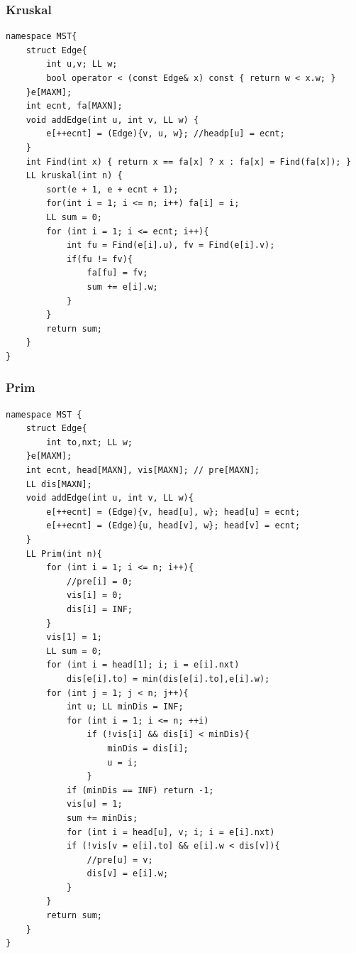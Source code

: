 \documentclass[10pt]{ctexart}
\begin{document}
{\subsubsection{Kruskal}
\begin{lstlisting}
namespace MST{
    struct Edge{
        int u,v; LL w;
        bool operator < (const Edge& x) const { return w < x.w; }
    }e[MAXM];
    int ecnt, fa[MAXN];
    void addEdge(int u, int v, LL w) {
        e[++ecnt] = (Edge){v, u, w}; //headp[u] = ecnt;
    }
    int Find(int x) { return x == fa[x] ? x : fa[x] = Find(fa[x]); }
    LL kruskal(int n) {
        sort(e + 1, e + ecnt + 1);
        for(int i = 1; i <= n; i++) fa[i] = i;
        LL sum = 0;
        for (int i = 1; i <= ecnt; i++){
            int fu = Find(e[i].u), fv = Find(e[i].v);
            if(fu != fv){
                fa[fu] = fv;
                sum += e[i].w;
            }
        }
        return sum;
    }
}
\end{lstlisting}
\subsubsection{Prim}
\begin{lstlisting}
namespace MST {
    struct Edge{
        int to,nxt; LL w;
    }e[MAXM];
    int ecnt, head[MAXN], vis[MAXN]; // pre[MAXN];
    LL dis[MAXN];
    void addEdge(int u, int v, LL w){
        e[++ecnt] = (Edge){v, head[u], w}; head[u] = ecnt;
        e[++ecnt] = (Edge){u, head[v], w}; head[v] = ecnt;
    }
    LL Prim(int n){
        for (int i = 1; i <= n; i++){
            //pre[i] = 0;
            vis[i] = 0;
            dis[i] = INF;
        }
        vis[1] = 1;
        LL sum = 0;
        for (int i = head[1]; i; i = e[i].nxt)
            dis[e[i].to] = min(dis[e[i].to],e[i].w);
        for (int j = 1; j < n; j++){
            int u; LL minDis = INF;
            for (int i = 1; i <= n; ++i)
                if (!vis[i] && dis[i] < minDis){
                    minDis = dis[i];
                    u = i;
                }
            if (minDis == INF) return -1;
            vis[u] = 1;
            sum += minDis;
            for (int i = head[u], v; i; i = e[i].nxt)
            if (!vis[v = e[i].to] && e[i].w < dis[v]){
                //pre[u] = v;
                dis[v] = e[i].w;
            }
        }
        return sum;
    }
}
\end{lstlisting}
}
\end{document}
